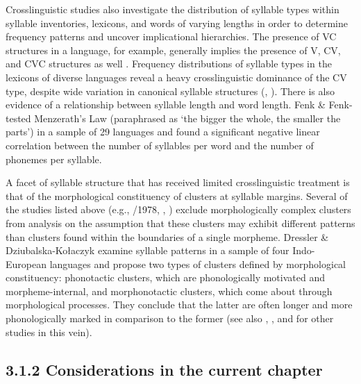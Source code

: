   Crosslinguistic studies also investigate the distribution of syllable types within syllable inventories, lexicons, and words of varying lengths in order to determine frequency patterns and uncover implicational hierarchies. The presence of VC structures in a language, for example, generally implies the presence of V, CV, and CVC structures as well \citep{Blevins1995}. Frequency distributions of syllable types in the lexicons of diverse languages reveal a heavy crosslinguistic dominance of the CV type, despite wide variation in canonical syllable structures (\citealt{Rousset2004}, \citealt{ValléeEtAl2009}). There is also evidence of a relationship between syllable length and word length. Fenk \& Fenk-\citet{Oczlon1993} tested Menzerath’s Law (paraphrased as ‘the bigger the whole, the smaller the parts’) in a sample of 29 languages and found a significant negative linear correlation between the number of syllables per word and the number of phonemes per syllable.



  A facet of syllable structure that has received limited crosslinguistic treatment is that of the morphological constituency of clusters at syllable margins. Several of the studies listed above (e.g., \citealt{Greenberg1965}/1978, \citealt{Morelli1999}, \citealt{Kreitman2008}) exclude morphologically complex clusters from analysis on the assumption that these clusters may exhibit different patterns than clusters found within the boundaries of a single morpheme. Dressler \& Dziubalska-Kołaczyk  examine syllable patterns in a sample of four Indo-European languages and propose two types of clusters defined by morphological constituency: phonotactic clusters, which are phonologically motivated and morpheme-internal, and morphonotactic clusters, which come about through morphological processes. They conclude that the latter are often longer and more phonologically marked in comparison to the former (see also \citealt{DresslerEtAl2010}, \citealt{Orzechowska2012}, and \citealt{DresslerEtAl2015} for other studies in this vein).


\subsection{3.1.2 Considerations in the current chapter}

